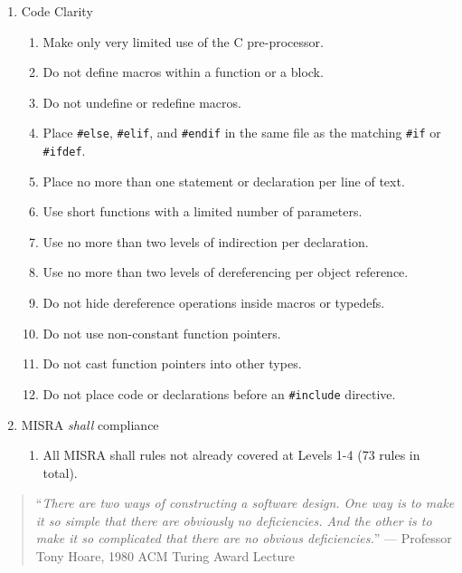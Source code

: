 \documentclass[11pt]{article}
\def\rootdir{../}
\begin{document}
\begin{enumerate}
 \item Code Clarity 
 \begin{enumerate}
  \item Make only very limited use of the C pre-processor. 
  \item Do not define macros within a function or a block. 
  \item Do not undefine or redefine macros. 
  \item Place \texttt{\#else}, \texttt{\#elif}, and \texttt{\#endif} in the same file as the matching \texttt{\#if} or \texttt{\#ifdef}. 
  \item Place no more than one statement or declaration per line of text. 
  \item Use short functions with a limited number of parameters. 
  \item Use no more than two levels of indirection per declaration. 
  \item Use no more than two levels of dereferencing per object reference. 
  \item Do not hide dereference operations inside macros or typedefs. 
  \item Do not use non-constant function pointers. 
  \item Do not cast function pointers into other types. 
  \item Do not place code or declarations before an \texttt{\#include} directive. 
 \end{enumerate}

 \item MISRA \emph{shall} compliance 
 \begin{enumerate}
   \item All MISRA shall rules not already covered at Levels 1-4 (73 rules in total).
 \end{enumerate}

\end{enumerate}

\vfill

\begin{quote}
``\emph{There are two ways of constructing a software design. One way is to make it so simple that there are obviously no deficiencies. And the other is to make it so complicated that there are no obvious deficiencies.}'' --- \textnormal{Professor Tony Hoare, 1980 ACM Turing Award Lecture}
\end{quote}

\pagebreak

\lstset{language=Ada}
\lstset{aboveskip=3mm}

\end{document}
